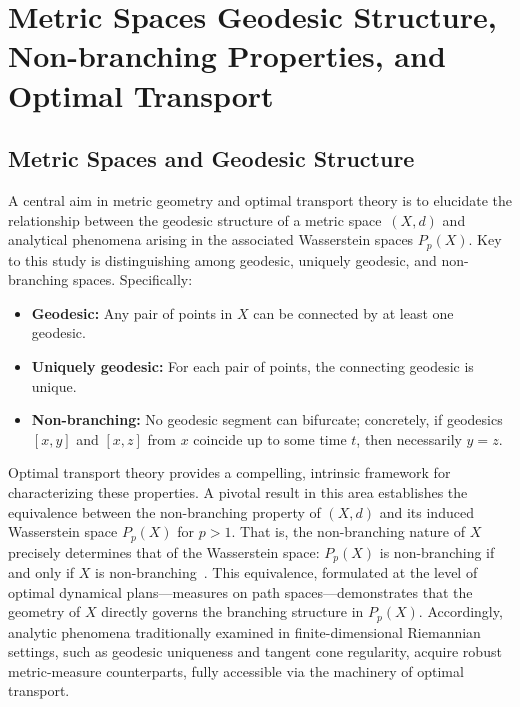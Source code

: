 \section{Metric Spaces Geodesic Structure, Non-branching Properties, and Optimal Transport}

\subsection{Metric Spaces and Geodesic Structure}

A central aim in metric geometry and optimal transport theory is to elucidate the relationship between the geodesic structure of a metric space~$(X, d)$ and analytical phenomena arising in the associated Wasserstein spaces $P_p(X)$. Key to this study is distinguishing among geodesic, uniquely geodesic, and non-branching spaces. Specifically:

\begin{itemize}
    \item \textbf{Geodesic:} Any pair of points in $X$ can be connected by at least one geodesic.
    \item \textbf{Uniquely geodesic:} For each pair of points, the connecting geodesic is unique.
    \item \textbf{Non-branching:} No geodesic segment can bifurcate; concretely, if geodesics $[x, y]$ and $[x, z]$ from $x$ coincide up to some time $t$, then necessarily $y = z$.
\end{itemize}

Optimal transport theory provides a compelling, intrinsic framework for characterizing these properties. A pivotal result in this area establishes the equivalence between the non-branching property of $(X, d)$ and its induced Wasserstein space $P_p(X)$ for $p > 1$. That is, the non-branching nature of $X$ precisely determines that of the Wasserstein space: $P_p(X)$ is non-branching if and only if $X$ is non-branching~\cite{ref107}. This equivalence, formulated at the level of optimal dynamical plans—measures on path spaces—demonstrates that the geometry of $X$ directly governs the branching structure in $P_p(X)$. Accordingly, analytic phenomena traditionally examined in finite-dimensional Riemannian settings, such as geodesic uniqueness and tangent cone regularity, acquire robust metric-measure counterparts, fully accessible via the machinery of optimal transport.

